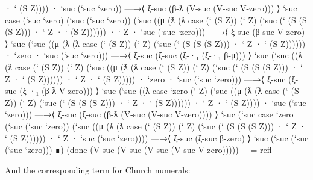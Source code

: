 \begin{fence}
\begin{code}
        · ` (S Z))))
     · `suc (`suc `zero))
   —→⟨ ξ-suc (β-ƛ (V-suc (V-suc V-zero))) ⟩
    `suc
    case (`suc `zero) (`suc (`suc `zero))
    (`suc
     ((μ
       (ƛ
        (ƛ
         case (` (S Z)) (` Z) (`suc (` (S (S (S Z))) · ` Z · ` (S Z))))))
      · ` Z
      · `suc (`suc `zero)))
   —→⟨ ξ-suc (β-suc V-zero) ⟩
    `suc
    (`suc
     ((μ
       (ƛ
        (ƛ
         case (` (S Z)) (` Z) (`suc (` (S (S (S Z))) · ` Z · ` (S Z))))))
      · `zero
      · `suc (`suc `zero)))
   —→⟨ ξ-suc (ξ-suc (ξ-·₁ (ξ-·₁ β-μ))) ⟩
    `suc
    (`suc
     ((ƛ
       (ƛ
        case (` (S Z)) (` Z)
        (`suc
         ((μ
           (ƛ
            (ƛ
             case (` (S Z)) (` Z) (`suc (` (S (S (S Z))) · ` Z · ` (S Z))))))
          · ` Z
          · ` (S Z)))))
      · `zero
      · `suc (`suc `zero)))
   —→⟨ ξ-suc (ξ-suc (ξ-·₁ (β-ƛ V-zero))) ⟩
    `suc
    (`suc
     ((ƛ
       case `zero (` Z)
       (`suc
        ((μ
          (ƛ
           (ƛ
            case (` (S Z)) (` Z) (`suc (` (S (S (S Z))) · ` Z · ` (S Z))))))
         · ` Z
         · ` (S Z))))
      · `suc (`suc `zero)))
   —→⟨ ξ-suc (ξ-suc (β-ƛ (V-suc (V-suc V-zero)))) ⟩
    `suc
    (`suc
     case `zero (`suc (`suc `zero))
     (`suc
      ((μ
        (ƛ
         (ƛ
          case (` (S Z)) (` Z) (`suc (` (S (S (S Z))) · ` Z · ` (S Z))))))
       · ` Z
       · `suc (`suc `zero))))
   —→⟨ ξ-suc (ξ-suc β-zero) ⟩
    `suc (`suc (`suc (`suc `zero)))
   ∎)
   (done (V-suc (V-suc (V-suc (V-suc V-zero)))))
_ = refl
\end{code}
\end{fence}

And the corresponding term for Church numerals:

